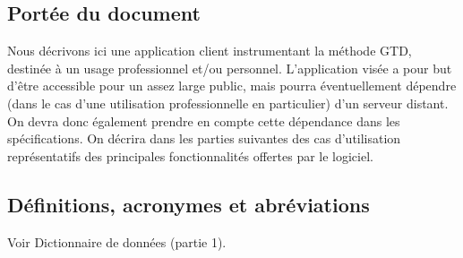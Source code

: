 	\subsection{Portée du document}

Nous décrivons ici une application client instrumentant la méthode GTD, destinée à un usage professionnel et/ou personnel. L'application visée a pour but d'être accessible pour un assez large public, mais pourra éventuellement dépendre (dans le cas d'une utilisation professionnelle en particulier) d'un serveur distant.
On devra donc également prendre en compte cette dépendance dans les spécifications.
On décrira dans les parties suivantes des cas d'utilisation représentatifs des principales fonctionnalités offertes par le logiciel.

	\subsection{Définitions, acronymes et abréviations}

	Voir Dictionnaire de données (partie 1).






